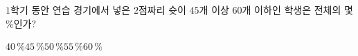 $1$학기 동안 연습 경기에서 넣은 $2$점짜리 슛이 $45$개 이상 $60$개 이하인 학생은 전체의 몇 $\%$인가?
\begin{choices32}{$40\,\%$}{$45\,\%$}{$50\,\%$}{$55\,\%$}{$60\,\%$}\end{choices32}
